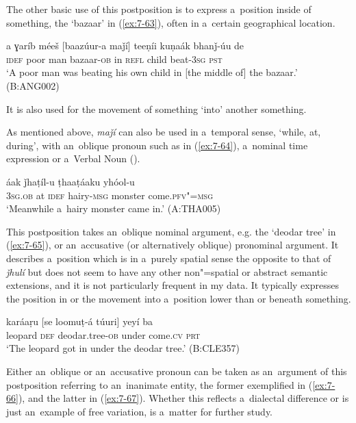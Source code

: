 The other basic use of this postposition is to express a~position inside of something, the `bazaar' in (\ref{ex:7-63}), often in a~certain geographical location.

\begin{exe}
\ex
\label{ex:7-63}
\gll a ɣaríb méeš [baazúur-a maǰí] teeṇíi kuṇaák bhanǰ-úu de \\
\textsc{idef} poor man bazaar-\textsc{ob} in \textsc{refl} child beat-\textsc{3sg} \textsc{pst} \\
\glt `A poor man was beating his own child in [the middle of] the bazaar.' (B:ANG002)
\end{exe}

It is also used for the movement of something `into' another something.


As mentioned above, \textit{maǰí} can also be used in a~temporal sense, `while, at, during', with an~oblique pronoun such as in (\ref{ex:7-64}), a~nominal time expression or a~Verbal Noun ().

\begin{exe}
\ex
\label{ex:7-64}
 áak ǰhaṭíl-u ṭhaaṭáaku yhóol-u \\
\textsc{3sg.ob} at \textsc{idef} hairy-\textsc{msg} monster come.\textsc{pfv"=msg} \\
\glt `Meanwhile a~hairy monster came in.' (A:THA005)
\end{exe}

 This postposition takes an~oblique nominal argument, e.g. the `deodar tree' in (\ref{ex:7-65}), or an~accusative (or alternatively oblique) pronominal argument. It describes a~position which is in a~purely spatial sense the opposite to that of \textit{ǰhulí} but does not seem to have any other non"=spatial or abstract semantic extensions, and it is not particularly frequent in my data. It typically expresses the position in or the movement into a~position lower than or beneath something.

\begin{exe}
\ex
\label{ex:7-65}
\gll karáaṛu [se loomuṭ-á túuri] yeyí ba \\
leopard \textsc{def} deodar.tree-\textsc{ob} under come.\textsc{cv} \textsc{prt} \\
\glt `The leopard got in under the deodar tree.' (B:CLE357)
\end{exe}

Either an~oblique or an~accusative pronoun can be taken as an~argument of this postposition referring to an~inanimate entity, the former exemplified in (\ref{ex:7-66}), and the latter in (\ref{ex:7-67}). Whether this reflects a~dialectal difference or is just an~example of free variation, is a~matter for further study.

